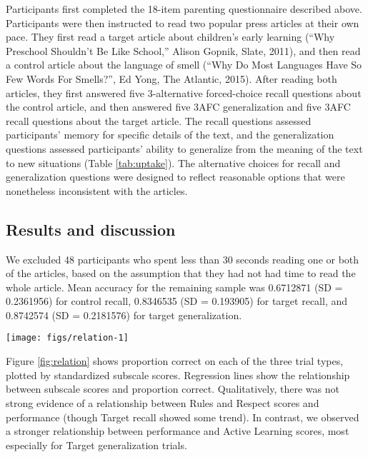 \documentclass[10pt, letterpaper]{article}
\newenvironment{CodeChunk}{}{}
\begin{document}
Participants first completed the 18-item parenting questionnaire
described above. Participants were then instructed to read two popular
press articles at their own pace. They first read a target article about
children's early learning (``Why Preschool Shouldn't Be Like School,''
Alison Gopnik, Slate, 2011), and then read a control article about the
language of smell (``Why Do Most Languages Have So Few Words For
Smells?'', Ed Yong, The Atlantic, 2015). After reading both articles,
they first answered five 3-alternative forced-choice recall questions
about the control article, and then answered five 3AFC generalization
and five 3AFC recall questions about the target article. The recall
questions assessed participants' memory for specific details of the
text, and the generalization questions assessed participants' ability to
generalize from the meaning of the text to new situations (Table
\ref{tab:uptake}). The alternative choices for recall and generalization
questions were designed to reflect reasonable options that were
nonetheless inconsistent with the articles.

\subsection{Results and discussion}\label{results-and-discussion}

We excluded 48 participants who spent less than 30 seconds reading one
or both of the articles, based on the assumption that they had not had
time to read the whole article. Mean accuracy for the remaining sample
was 0.6712871 (SD = 0.2361956) for control recall, 0.8346535 (SD =
0.193905) for target recall, and 0.8742574 (SD = 0.2181576) for target
generalization.

\begin{CodeChunk}
\begin{figure*}[h]

{\centering \texttt{[image: figs/relation-1]} 

}

\caption[Relationship between subscale scores and uptake of articles]{Relationship between subscale scores and uptake of articles.}\label{fig:relation}
\end{figure*}
\end{CodeChunk}

Figure \ref{fig:relation} shows proportion correct on each of the three
trial types, plotted by standardized subscale scores. Regression lines
show the relationship between subscale scores and proportion correct.
Qualitatively, there was not strong evidence of a relationship between
Rules and Respect scores and performance (though Target recall showed
some trend). In contrast, we observed a stronger relationship between
performance and Active Learning scores, most especially for Target
generalization trials.
\end{document}

